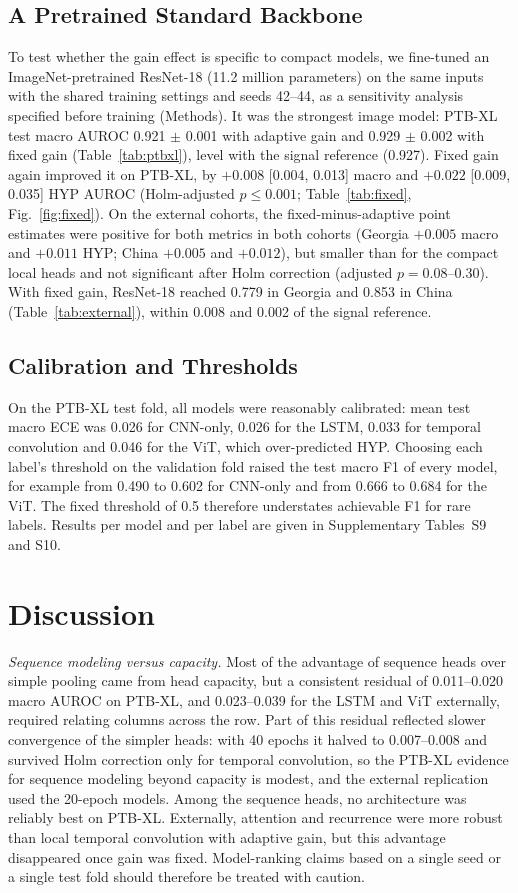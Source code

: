 \documentclass[journal]{IEEEtran}
\begin{document}
\subsection{A Pretrained Standard Backbone}
To test whether the gain effect is specific to compact models, we fine-tuned an ImageNet-pretrained ResNet-18 \cite{he2016resnet} (11.2 million parameters) on the same inputs with the shared training settings and seeds 42--44, as a sensitivity analysis specified before training (Methods). It was the strongest image model: PTB-XL test macro AUROC 0.921 $\pm$ 0.001 with adaptive gain and 0.929 $\pm$ 0.002 with fixed gain (Table~\ref{tab:ptbxl}), level with the signal reference (0.927). Fixed gain again improved it on PTB-XL, by $+0.008$ [0.004, 0.013] macro and $+0.022$ [0.009, 0.035] HYP AUROC (Holm-adjusted $p\le0.001$; Table~\ref{tab:fixed}, Fig.~\ref{fig:fixed}). On the external cohorts, the fixed-minus-adaptive point estimates were positive for both metrics in both cohorts (Georgia $+0.005$ macro and $+0.011$ HYP; China $+0.005$ and $+0.012$), but smaller than for the compact local heads and not significant after Holm correction (adjusted $p=0.08$--$0.30$). With fixed gain, ResNet-18 reached 0.779 in Georgia and 0.853 in China (Table~\ref{tab:external}), within 0.008 and 0.002 of the signal reference.

\subsection{Calibration and Thresholds}
On the PTB-XL test fold, all models were reasonably calibrated: mean test macro ECE was 0.026 for CNN-only, 0.026 for the LSTM, 0.033 for temporal convolution and 0.046 for the ViT, which over-predicted HYP. Choosing each label's threshold on the validation fold raised the test macro F1 of every model, for example from 0.490 to 0.602 for CNN-only and from 0.666 to 0.684 for the ViT. The fixed threshold of 0.5 therefore understates achievable F1 for rare labels. Results per model and per label are given in Supplementary Tables~S9 and S10.

\section{Discussion}
\emph{Sequence modeling versus capacity.} Most of the advantage of sequence heads over simple pooling came from head capacity, but a consistent residual of 0.011--0.020 macro AUROC on PTB-XL, and 0.023--0.039 for the LSTM and ViT externally, required relating columns across the row. Part of this residual reflected slower convergence of the simpler heads: with 40 epochs it halved to 0.007--0.008 and survived Holm correction only for temporal convolution, so the PTB-XL evidence for sequence modeling beyond capacity is modest, and the external replication used the 20-epoch models. Among the sequence heads, no architecture was reliably best on PTB-XL. Externally, attention and recurrence were more robust than local temporal convolution with adaptive gain, but this advantage disappeared once gain was fixed. Model-ranking claims based on a single seed or a single test fold should therefore be treated with caution.
\end{document}
